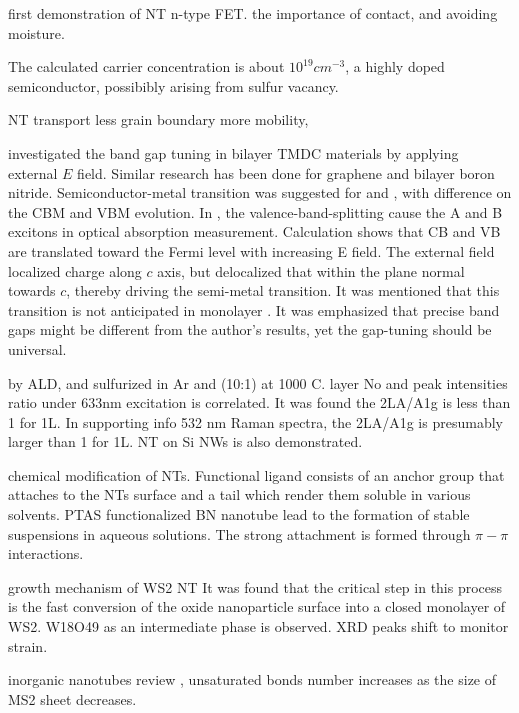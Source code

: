 first demonstration of  NT n-type FET. \cite{Levi2013}
the importance of contact, and avoiding moisture. 

The calculated carrier concentration is about $10^{19}cm^{-3}$, a highly doped semiconductor, possibibly arising from sulfur vacancy. 

 NT transport \cite{Zhang2012c}
less grain boundary more mobility, 

\citeauthor{Ramasubramaniam2011} investigated the band gap tuning in bilayer TMDC materials by applying external $E$ field. Similar research has been done for graphene and bilayer boron nitride. Semiconductor-metal transition was suggested for  and , with difference on the CBM and VBM evolution. In , the valence-band-splitting cause the A and B excitons in optical absorption measurement. Calculation shows that CB and VB are translated toward the Fermi level with increasing E field.  The external field localized charge along $c$ axis, but delocalized that within the plane normal towards $c$, thereby driving the semi-metal transition. It was mentioned that this transition is not anticipated in monolayer . It was emphasized that precise band gaps might be different from the author’s results, yet the gap-tuning should be universal.\cite{Ramasubramaniam2011}

\cite{Song2013}  by ALD, and sulfurized in Ar and  (10:1) at 1000 C.  layer No and peak intensities ratio under 633nm excitation is correlated. It was found the 2LA/A1g is less than 1 for 1L. In supporting info 532 nm Raman spectra, the 2LA/A1g is presumably larger than 1 for 1L.  NT on Si NWs is also demonstrated.

\cite{Tenne2010} chemical modification of NTs. Functional ligand consists of an anchor group that attaches to the NTs surface and a tail which render them soluble in various solvents. PTAS functionalized BN nanotube lead to the formation of stable suspensions in aqueous solutions. The strong attachment is formed through $\pi-\pi$ interactions.

growth mechanism of WS2 NT\cite{ZAK2009} 
It was found that the critical step in this process is the fast conversion of the oxide nanoparticle surface into a closed monolayer of WS2. W18O49 as an intermediate phase is observed. XRD peaks shift to monitor strain. 

inorganic nanotubes review \cite{Tenne2004} , unsaturated bonds number increases as the size of MS2 sheet decreases.

